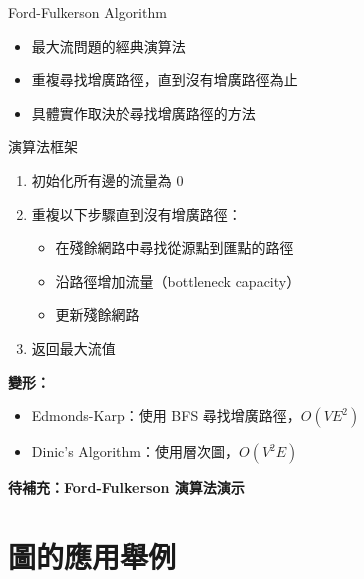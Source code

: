 \documentclass{beamer}
\begin{document}
\begin{frame}{Ford-Fulkerson Algorithm}
\begin{itemize}
    \item 最大流問題的經典演算法
    \item 重複尋找增廣路徑，直到沒有增廣路徑為止
    \item 具體實作取決於尋找增廣路徑的方法
\end{itemize}

\vspace{1em}
\begin{block}{演算法框架}
\begin{enumerate}
    \item 初始化所有邊的流量為 0
    \item 重複以下步驟直到沒有增廣路徑：
    \begin{itemize}
        \item 在殘餘網路中尋找從源點到匯點的路徑
        \item 沿路徑增加流量（bottleneck capacity）
        \item 更新殘餘網路
    \end{itemize}
    \item 返回最大流值
\end{enumerate}
\end{block}

\vspace{1em}
\textbf{變形：}
\begin{itemize}
    \item Edmonds-Karp：使用 BFS 尋找增廣路徑，$O(VE^2)$
    \item Dinic's Algorithm：使用層次圖，$O(V^2E)$
\end{itemize}

\vspace{1em}
\textbf{待補充：Ford-Fulkerson 演算法演示}
\end{frame}

\section{圖的應用舉例}
\end{document}
